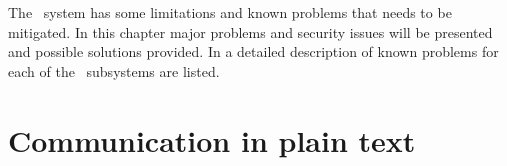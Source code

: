 The \appName\ system has some limitations and known problems that needs to be
mitigated. In this chapter major problems and security issues will be presented
and possible solutions provided. In  a detailed
description of known problems for each of the \appName\ subsystems are listed.

\section{Communication in plain text}


